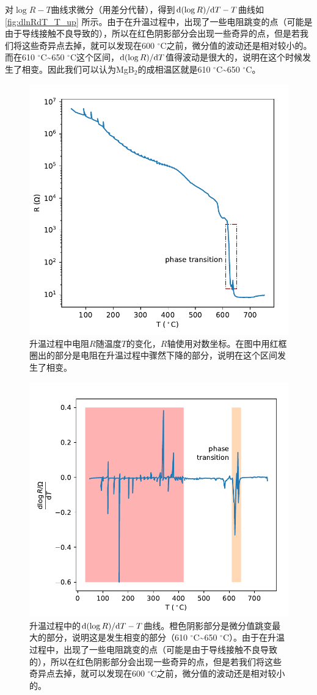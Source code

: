 \documentclass[font=default]{mpltx}
\begin{document}
对$\log R-T$曲线求微分（用差分代替），得到${\rm d}(\log R)/{\rm d}T-T$曲线如\autoref{fig:dlnRdT_T_up} 所示。由于在升温过程中，出现了一些电阻跳变的点（可能是由于导线接触不良导致的），所以在红色阴影部分会出现一些奇异的点，但是若我们将这些奇异点去掉，就可以发现在600 $^\circ$C之前，微分值的波动还是相对较小的。而在610 $^\circ$C\textasciitilde650 $^\circ$C这个区间，${\rm d}(\log R)/{\rm d}T$值得波动是很大的，说明在这个时候发生了相变。因此我们可以认为MgB$_2$的成相温区就是610 $^\circ$C\textasciitilde650 $^\circ$C。
\begin{figure}[h]
  \centering
  \includegraphics[width=0.5\linewidth]{fig/lnR_T_up.pdf}
  \caption{升温过程中电阻$R$随温度$T$的变化，$R$轴使用对数坐标。在图中用红框圈出的部分是电阻在升温过程中骤然下降的部分，说明在这个区间发生了相变。}
  \label{fig:lnR_T_up}
\end{figure}
\begin{figure}[h]
  \centering
  \includegraphics[width=0.53\linewidth]{fig/dlnRdT_T_up.pdf}
  \caption{升温过程中的${\rm d}(\log R)/{\rm d}T-T$曲线。橙色阴影部分是微分值跳变最大的部分，说明这是发生相变的部分（610 $^\circ$C\textasciitilde650 $^\circ$C）。由于在升温过程中，出现了一些电阻跳变的点（可能是由于导线接触不良导致的），所以在红色阴影部分会出现一些奇异的点，但是若我们将这些奇异点去掉，就可以发现在600 $^\circ$C之前，微分值的波动还是相对较小的。}
  \label{fig:dlnRdT_T_up}
\end{figure}
\end{document}
